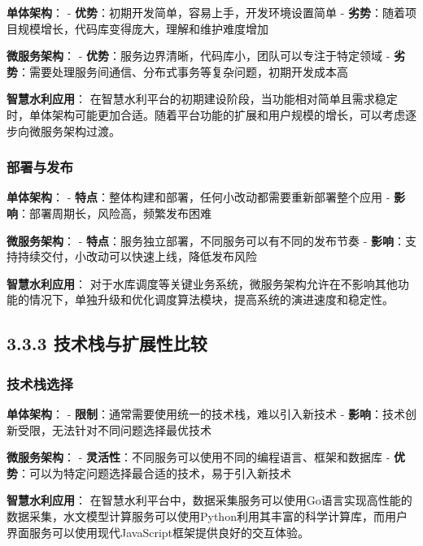 \textbf{单体架构}： -
\textbf{优势}：初期开发简单，容易上手，开发环境设置简单 -
\textbf{劣势}：随着项目规模增长，代码库变得庞大，理解和维护难度增加

\textbf{微服务架构}： -
\textbf{优势}：服务边界清晰，代码库小，团队可以专注于特定领域 -
\textbf{劣势}：需要处理服务间通信、分布式事务等复杂问题，初期开发成本高

\textbf{智慧水利应用}：
在智慧水利平台的初期建设阶段，当功能相对简单且需求稳定时，单体架构可能更加合适。随着平台功能的扩展和用户规模的增长，可以考虑逐步向微服务架构过渡。

\subsubsection{部署与发布}\label{ux90e8ux7f72ux4e0eux53d1ux5e03}

\textbf{单体架构}： -
\textbf{特点}：整体构建和部署，任何小改动都需要重新部署整个应用 -
\textbf{影响}：部署周期长，风险高，频繁发布困难

\textbf{微服务架构}： -
\textbf{特点}：服务独立部署，不同服务可以有不同的发布节奏 -
\textbf{影响}：支持持续交付，小改动可以快速上线，降低发布风险

\textbf{智慧水利应用}：
对于水库调度等关键业务系统，微服务架构允许在不影响其他功能的情况下，单独升级和优化调度算法模块，提高系统的演进速度和稳定性。

\subsection{3.3.3
技术栈与扩展性比较}\label{ux6280ux672fux6808ux4e0eux6269ux5c55ux6027ux6bd4ux8f83}

\subsubsection{技术栈选择}\label{ux6280ux672fux6808ux9009ux62e9}

\textbf{单体架构}： -
\textbf{限制}：通常需要使用统一的技术栈，难以引入新技术 -
\textbf{影响}：技术创新受限，无法针对不同问题选择最优技术

\textbf{微服务架构}： -
\textbf{灵活性}：不同服务可以使用不同的编程语言、框架和数据库 -
\textbf{优势}：可以为特定问题选择最合适的技术，易于引入新技术

\textbf{智慧水利应用}：
在智慧水利平台中，数据采集服务可以使用Go语言实现高性能的数据采集，水文模型计算服务可以使用Python利用其丰富的科学计算库，而用户界面服务可以使用现代JavaScript框架提供良好的交互体验。

